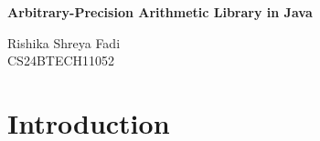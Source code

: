 \documentclass[12pt]{article}
\begin{document}
\begin{titlepage}
    \centering
    \vspace*{6cm}
    {\Huge\bfseries Arbitrary-Precision Arithmetic Library in Java\par}
    \vspace*{20mm}
    \vfill
    {\large Rishika Shreya Fadi \\ CS24BTECH11052\par}
\end{titlepage}

\setcounter{page}{1}
\pagestyle{plain}


\newpage

\section{Introduction}
\end{document}
